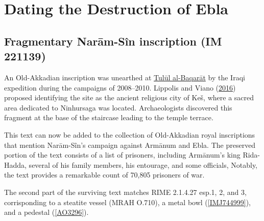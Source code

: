 \documentclass[
]{book}
\begin{document}
\hypertarget{dating-the-destruction-of-ebla}{%
\section{Dating the Destruction of Ebla}\label{dating-the-destruction-of-ebla}}

\hypertarget{IM221139}{%
\subsection{Fragmentary Narām-Sîn inscription (IM 221139)}\label{IM221139}}

An Old-Akkadian inscription was unearthed at \href{https://pleiades.stoa.org/places/698215287}{Tulūl al-Baqarāt} by the Iraqi expedition during the campaigns of 2008--2010. Lippolis and Viano (\protect\hyperlink{ref-LippolisViano2016}{2016}) proposed identifying the site as the ancient religious city of Keš, where a sacred area dedicated to Ninhursaga was located. Archaeologists discovered this fragment at the base of the staircase leading to the temple terrace.

This text can now be added to the collection of Old-Akkadian royal inscriptions that mention Narām-Sîn's campaign against Armānum and Ebla. The preserved portion of the text consists of a list of prisoners, including Armānum's king Rida-Hadda, several of his family members, his entourage, and some officials, Notably, the text provides a remarkable count of 70,805 prisoners of war.

The second part of the surviving text matches RIME 2.1.4.27 esp.1, 2, and 3, corrisponding to a steatite vessel (MRAH O.710), a metal bowl (\ref{IMJ744999}), and a pedestal (\ref{AO3296}).
\end{document}
